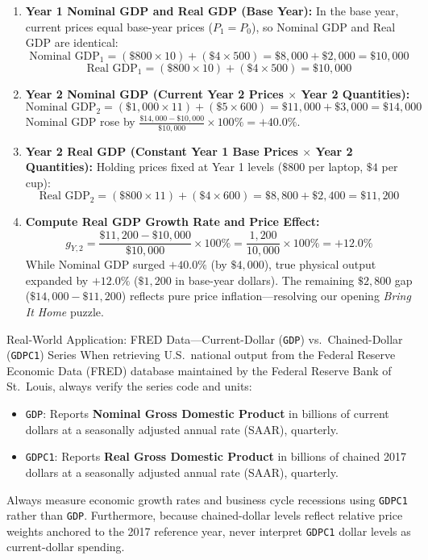 \documentclass[11pt,letterpaper]{article}
\begin{document}
\begin{enumerate}
    \item \textbf{Year 1 Nominal GDP and Real GDP (Base Year):}
    In the base year, current prices equal base-year prices ($P_1 = P_0$), so Nominal GDP and Real GDP are identical:
    $$\text{Nominal GDP}_1 = (\$800 \times 10) + (\$4 \times 500) = \$8{,}000 + \$2{,}000 = \$10{,}000$$
    $$\text{Real GDP}_1 = (\$800 \times 10) + (\$4 \times 500) = \$10{,}000$$
    \item \textbf{Year 2 Nominal GDP (Current Year 2 Prices $\times$ Year 2 Quantities):}
    $$\text{Nominal GDP}_2 = (\$1{,}000 \times 11) + (\$5 \times 600) = \$11{,}000 + \$3{,}000 = \$14{,}000$$
    Nominal GDP rose by $\frac{\$14{,}000 - \$10{,}000}{\$10{,}000} \times 100\% = +40.0\%$.
    \item \textbf{Year 2 Real GDP (Constant Year 1 Base Prices $\times$ Year 2 Quantities):}
    Holding prices fixed at Year 1 levels ($\$800$ per laptop, $\$4$ per cup):
    $$\text{Real GDP}_2 = (\$800 \times 11) + (\$4 \times 600) = \$8{,}800 + \$2{,}400 = \$11{,}200$$
    \item \textbf{Compute Real GDP Growth Rate and Price Effect:}
    $$g_{Y,2} = \frac{\$11{,}200 - \$10{,}000}{\$10{,}000} \times 100\% = \frac{1{,}200}{10{,}000} \times 100\% = +12.0\%$$
    While Nominal GDP surged $+40.0\%$ (by $\$4{,}000$), true physical output expanded by $+12.0\%$ ($\$1{,}200$ in base-year dollars). The remaining $\$2{,}800$ gap ($\$14{,}000 - \$11{,}200$) reflects pure price inflation—resolving our opening \emph{Bring It Home} puzzle.
\end{enumerate}

\begin{examplecase}{Real-World Application: FRED Data—Current-Dollar (\texttt{GDP}) vs.\ Chained-Dollar (\texttt{GDPC1}) Series}
When retrieving U.S.\ national output from the Federal Reserve Economic Data (FRED) database maintained by the Federal Reserve Bank of St.\ Louis, always verify the series code and units:
\begin{itemize}
    \item \texttt{GDP}: Reports \textbf{Nominal Gross Domestic Product} in billions of current dollars at a seasonally adjusted annual rate (SAAR), quarterly.
    \item \texttt{GDPC1}: Reports \textbf{Real Gross Domestic Product} in billions of chained 2017 dollars at a seasonally adjusted annual rate (SAAR), quarterly.
\end{itemize}
Always measure economic growth rates and business cycle recessions using \texttt{GDPC1} rather than \texttt{GDP}. Furthermore, because chained-dollar levels reflect relative price weights anchored to the 2017 reference year, never interpret \texttt{GDPC1} dollar levels as current-dollar spending.
\end{examplecase}
\end{document}
